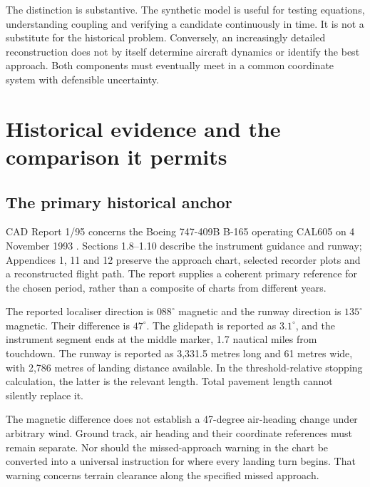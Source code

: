 The distinction is substantive. The synthetic model is useful for testing equations, understanding coupling and verifying a candidate continuously in time. It is not a substitute for the historical problem. Conversely, an increasingly detailed reconstruction does not by itself determine aircraft dynamics or identify the best approach. Both components must eventually meet in a common coordinate system with defensible uncertainty.

\section{Historical evidence and the comparison it permits}
\label{sec:evidence}
\subsection{The primary historical anchor}
CAD Report 1/95 concerns the Boeing 747-409B B-165 operating CAL605 on 4 November 1993 \cite{cad}. Sections 1.8--1.10 describe the instrument guidance and runway; Appendices 1, 11 and 12 preserve the approach chart, selected recorder plots and a reconstructed flight path. The report supplies a coherent primary reference for the chosen period, rather than a composite of charts from different years.

The reported localiser direction is $088^\circ$ magnetic and the runway direction is $135^\circ$ magnetic. Their difference is $47^\circ$. The glidepath is reported as $3.1^\circ$, and the instrument segment ends at the middle marker, 1.7 nautical miles from touchdown. The runway is reported as 3,331.5 metres long and 61 metres wide, with 2,786 metres of landing distance available. In the threshold-relative stopping calculation, the latter is the relevant length. Total pavement length cannot silently replace it.

The magnetic difference does not establish a 47-degree air-heading change under arbitrary wind. Ground track, air heading and their coordinate references must remain separate. Nor should the missed-approach warning in the chart be converted into a universal instruction for where every landing turn begins. That warning concerns terrain clearance along the specified missed approach.

